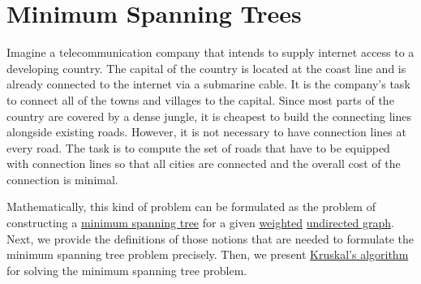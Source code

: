 \section{Minimum Spanning Trees}
Imagine a telecommunication company that intends to supply internet access to a developing country.
The capital of the country is located at the coast line and is already connected to the internet via
a submarine cable. It is the company's task to connect all of the towns and villages to the capital.
Since most parts of the country are covered by a dense jungle, it is cheapest to build the connecting lines
alongside existing roads.  However, it is not necessary to have connection lines at every road.  The task is to
compute the set of roads that have to be equipped with connection lines so that all cities are connected and
the overall cost of the connection is minimal.

Mathematically, this kind of problem can be formulated as the problem of
constructing a \href{https://en.wikipedia.org/wiki/Minimum_spanning_tree}{minimum spanning tree} for
a given \href{https://en.wikipedia.org/wiki/Graph_(discrete_mathematics)#Weighted_graph}{weighted}
\href{https://en.wikipedia.org/wiki/Graph_(discrete_mathematics)#Undirected_graph}{undirected graph}.
Next, we provide the definitions of those notions that are needed to formulate the minimum spanning
tree problem precisely.  Then, we present
\href{https://en.wikipedia.org/wiki/Kruskal%27s_algorithm}{Kruskal's algorithm} for solving the
minimum spanning tree problem. 

